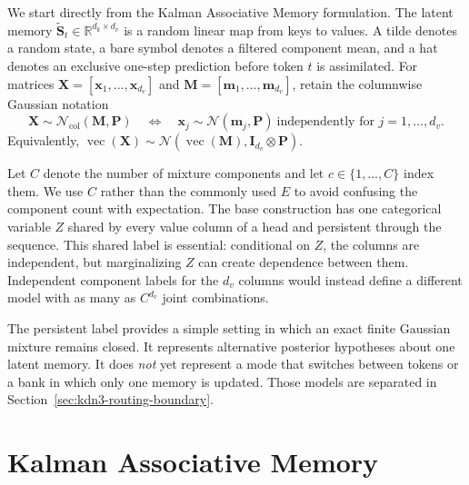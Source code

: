 \documentclass[11pt]{article}
\newcommand{\R}{\mathbb{R}}
\newcommand{\ve}[1]{\boldsymbol{#1}}
\newcommand{\Normal}{\mathcal{N}}
\begin{document}
We start directly from the Kalman Associative Memory formulation.  The latent memory
$\widetilde{\ve{S}}_t\in\R^{d_k\times d_v}$ is a random linear map from keys to values.  A tilde
denotes a random state, a bare symbol denotes a filtered component mean, and a hat denotes an
exclusive one-step prediction before token $t$ is assimilated.  For matrices
$\ve{X}=[\ve{x}_1,\ldots,\ve{x}_{d_v}]$ and
$\ve{M}=[\ve{m}_1,\ldots,\ve{m}_{d_v}]$, retain the columnwise Gaussian notation
\begin{equation}
  \ve{X}\sim\Normal_{\mathrm{col}}(\ve{M},\ve{P})
  \quad\Longleftrightarrow\quad
  \ve{x}_j\sim\Normal(\ve{m}_j,\ve{P})
  \ \text{independently for }j=1,\ldots,d_v.
  \label{eq:kdn3-columnwise-gaussian}
\end{equation}
Equivalently,
$\operatorname{vec}(\ve{X})\sim
\Normal(\operatorname{vec}(\ve{M}),\ve{I}_{d_v}\otimes\ve{P})$.

Let $C$ denote the number of mixture components and let $c\in\{1,\ldots,C\}$ index them.  We use
$C$ rather than the commonly used $E$ to avoid confusing the component count with expectation.
The base construction has one categorical variable
$Z$ shared by every value column of a head and persistent through the sequence.  This shared label
is essential: conditional on $Z$, the columns are independent, but marginalizing $Z$ can create
dependence between them.  Independent component labels for the $d_v$ columns would instead define
a different model with as many as $C^{d_v}$ joint combinations.

The persistent label provides a simple setting in which an exact finite Gaussian mixture remains
closed.  It represents alternative posterior hypotheses about one latent memory.  It does
\emph{not} yet represent a mode that switches between tokens or a bank in which only one memory is
updated.  Those models are separated in Section~\ref{sec:kdn3-routing-boundary}.

\section{Kalman Associative Memory}
\label{sec:kdn3-kam}
\end{document}
